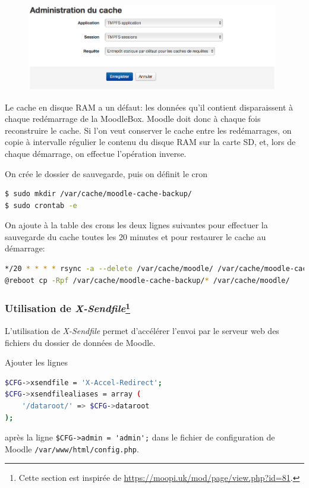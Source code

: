 \documentclass[11pt]{article}
\begin{document}
\begin{figure}[!ht]
\begin{minipage}[b]{\linewidth}
\centering
\includegraphics[width=11cm]{cache-association.png}
\end{minipage}
\end{figure}

Le cache en disque RAM a un défaut: les données qu'il contient disparaissent à chaque redémarrage de la MoodleBox. Moodle doit donc à chaque fois reconstruire le cache. Si l'on veut conserver le cache entre les redémarrages, on copie à intervalle régulier le contenu du disque RAM sur la carte SD, et, lors de chaque démarrage, on effectue l'opération inverse.

On crée le dossier de sauvegarde, puis on définit le cron
\begin{lstlisting}[language=bash]
$ sudo mkdir /var/cache/moodle-cache-backup/
$ sudo crontab -e
\end{lstlisting}

On ajoute à la table des crons les deux lignes suivantes pour effectuer la sauvegarde du cache toutes les 20 minutes et pour restaurer le cache au démarrage:
\begin{lstlisting}[language=bash]
*/20 * * * * rsync -a --delete /var/cache/moodle/ /var/cache/moodle-cache-backup/
@reboot cp -Rpf /var/cache/moodle-cache-backup/* /var/cache/moodle/
\end{lstlisting}

\subsubsection[Utilisation de \emph{X-Sendfile}]{Utilisation de \emph{X-Sendfile}\footnote{Cette section est inspirée de \url{https://moopi.uk/mod/page/view.php?id=81}.}}

L'utilisation de \emph{X-Sendfile} permet d'accélérer l'envoi par le serveur web des fichiers du dossier de données de Moodle.

Ajouter les lignes
\begin{lstlisting}[language=bash]
$CFG->xsendfile = 'X-Accel-Redirect';
$CFG->xsendfilealiases = array (
    '/dataroot/' => $CFG->dataroot
);
\end{lstlisting}
après la ligne \lstinline{$CFG->admin = 'admin';} dans le fichier de configuration de Moodle \lstinline{/var/www/html/config.php}.
\end{document}
